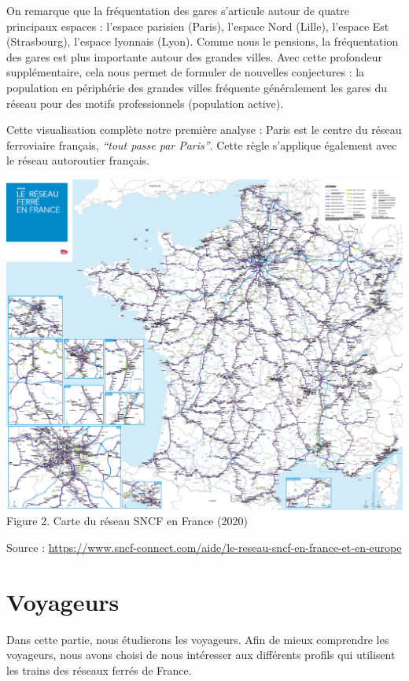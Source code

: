 \documentclass[
]{article}
\begin{document}
On remarque que la fréquentation des gares s'articule autour de quatre
principaux espaces : l'espace parisien (Paris), l'espace Nord (Lille),
l'espace Est (Strasbourg), l'espace lyonnais (Lyon). Comme nous le
pensions, la fréquentation des gares est plus importante autour des
grandes villes. Avec cette profondeur supplémentaire, cela nous permet
de formuler de nouvelles conjectures : la population en périphérie des
grandes villes fréquente généralement les gares du réseau pour des
motifs professionnels (population active).

Cette visualisation complète notre première analyse : Paris est le
centre du réseau ferroviaire français, \emph{``tout passe par Paris''}.
Cette règle s'applique également avec le réseau autoroutier français.

\includegraphics{images/carte-reseau-sncf-france2020.png} Figure 2.
Carte du réseau SNCF en France (2020)

Source :
\url{https://www.sncf-connect.com/aide/le-reseau-sncf-en-france-et-en-europe}

\hypertarget{voyageurs}{%
\section{Voyageurs}\label{voyageurs}}

Dans cette partie, nous étudierons les voyageurs. Afin de mieux
comprendre les voyageurs, nous avons choisi de nous intéresser aux
différents profils qui utilisent les trains des réseaux ferrés de
France.
\end{document}
